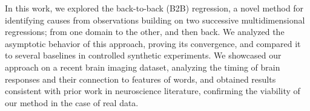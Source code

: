 In this work, we explored the back-to-back (B2B) regression, a novel method for
identifying causes from observations building on two successive
multidimensional regressions; from one domain to the other, and then back.
We analyzed the asymptotic behavior of this approach, proving its convergence,
and compared it to several baselines in controlled synthetic experiments. We
showcased our approach on a recent brain imaging dataset, analyzing the timing
of brain responses and their connection to features of words, and obtained
results consistent with prior work in neuroscience literature, confirming the
viability of our method in the case of real data.
